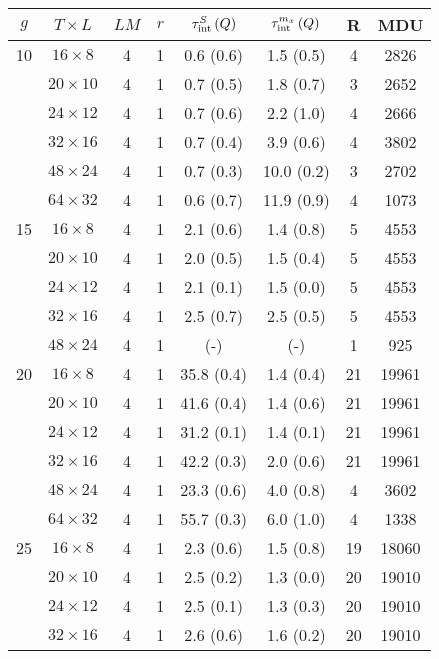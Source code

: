 \begin{longtable}{cccccccc}
\toprule
$g$ & $T\times L$ & $LM$ & $r$ & $\tau_{\rm int}^{S}\,(Q)$ & $\tau_{\rm int}^{m_x}\,(Q)$ & R & MDU \\
\midrule
 10 & $16 \times   8$ &  4 & 1 & 0.6 \; (0.6) & 1.5 \; (0.5) & 4 & 2826 \\
    & $20 \times  10$ &  4 & 1 & 0.7 \; (0.5) & 1.8 \; (0.7) & 3 & 2652 \\
    & $24 \times  12$ &  4 & 1 & 0.7 \; (0.6) & 2.2 \; (1.0) & 4 & 2666 \\
    & $32 \times  16$ &  4 & 1 & 0.7 \; (0.4) & 3.9 \; (0.6) & 4 & 3802 \\
    & $48 \times  24$ &  4 & 1 & 0.7 \; (0.3) & 10.0 \; (0.2) & 3 & 2702 \\
    & $64 \times  32$ &  4 & 1 & 0.6 \; (0.7) & 11.9 \; (0.9) & 4 & 1073 \\
\midrule
 15 & $16 \times   8$ &  4 & 1 & 2.1 \; (0.6) & 1.4 \; (0.8) & 5 & 4553 \\
    & $20 \times  10$ &  4 & 1 & 2.0 \; (0.5) & 1.5 \; (0.4) & 5 & 4553 \\
    & $24 \times  12$ &  4 & 1 & 2.1 \; (0.1) & 1.5 \; (0.0) & 5 & 4553 \\
    & $32 \times  16$ &  4 & 1 & 2.5 \; (0.7) & 2.5 \; (0.5) & 5 & 4553 \\
    & $48 \times  24$ &  4 & 1 & \!\!\!2.0 \quad (-) & \!\!\!3.7 \quad (-) & 1 & 925 \\
\midrule
 20 & $16 \times   8$ &  4 & 1 & 35.8 \; (0.4) & 1.4 \; (0.4) & 21 & 19961 \\
    & $20 \times  10$ &  4 & 1 & 41.6 \; (0.4) & 1.4 \; (0.6) & 21 & 19961 \\
    & $24 \times  12$ &  4 & 1 & 31.2 \; (0.1) & 1.4 \; (0.1) & 21 & 19961 \\
    & $32 \times  16$ &  4 & 1 & 42.2 \; (0.3) & 2.0 \; (0.6) & 21 & 19961 \\
    & $48 \times  24$ &  4 & 1 & 23.3 \; (0.6) & 4.0 \; (0.8) & 4 & 3602 \\
    & $64 \times  32$ &  4 & 1 & 55.7 \; (0.3) & 6.0 \; (1.0) & 4 & 1338 \\
\midrule
 25 & $16 \times   8$ &  4 & 1 & 2.3 \; (0.6) & 1.5 \; (0.8) & 19 & 18060 \\
    & $20 \times  10$ &  4 & 1 & 2.5 \; (0.2) & 1.3 \; (0.0) & 20 & 19010 \\
    & $24 \times  12$ &  4 & 1 & 2.5 \; (0.1) & 1.3 \; (0.3) & 20 & 19010 \\
    & $32 \times  16$ &  4 & 1 & 2.6 \; (0.6) & 1.6 \; (0.2) & 20 & 19010 \\

\end{longtable}
